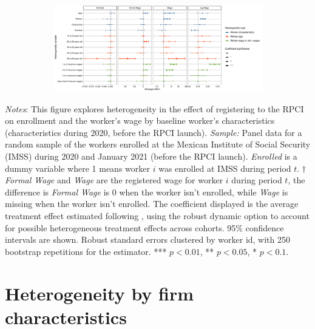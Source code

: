 \documentclass[10pt, oneside]{book}
\begin{document}
\begin{figure}[H]
    \centering
    \caption{Heterogeneity by worker characteristics \label{fig:heterogeneity_worker_rpci}}
    
    \begin{subfigure}{\textwidth}
    \includegraphics[width=\textwidth]{04_Figures/muestra_10porciento/dcdh_heterogeneity_worker_characteristics.pdf}
    \end{subfigure}
    
\end{figure}

\scriptsize{
\noindent \textit{Notes}: This figure explores heterogeneity in the effect of registering to the RPCI on enrollment and the worker's wage by baseline worker's characteristics (characteristics during 2020, before the RPCI launch). \textit{Sample:} Panel data for a random sample of the workers enrolled at the Mexican Institute of Social Security (IMSS) during 2020 and January 2021 (before the RPCI launch). \textit{Enrolled} is a dummy variable where 1 means worker $i$ was enrolled at IMSS during period $t$. $\dagger$ \textit{Formal Wage} and \textit{Wage} are the registered wage for worker $i$ during period $t$, the difference is \textit{Formal Wage} is 0 when the worker isn't enrolled, while \textit{Wage} is missing when the worker isn't enrolled. The coefficient displayed is the average treatment effect estimated following \cite{de2020two}, using the robust dynamic option to account for possible heterogeneous treatment effects across cohorts. 95\% confidence intervals are shown. Robust standard errors clustered by worker id, with 250 bootstrap repetitions for the \cite{de2020two} estimator. *** $p<0.01$, ** $p<0.05$, * $p<0.1$. %
} \\

\normalsize

\section{Heterogeneity by firm characteristics}
\end{document}
